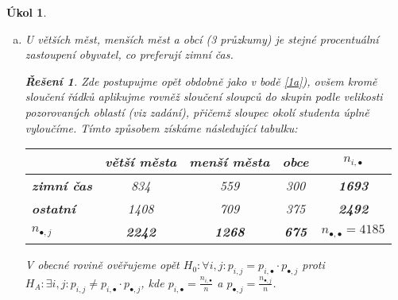 \documentclass[11pt, a4paper]{article}
\theoremstyle{result}
\newtheorem*{result}{Řešení}
\newtheorem{task}{Úkol}
\begin{document}
\begin{task}
\begin{enumerate}[a)]
        Všechny získané hodnoty splňují podmínku $\frac{n_{i, \bullet} \cdot n_{\bullet, j}}{n} > 5; \forall i,j$. Přejděme tedy k výpočtu testovacího kritéria:
        $$t = n \sum_{i=1}^{r} \sum_{j=1}^{c} \frac{n_{i, j}^2}{n_{i, \bullet} \cdot n_{\bullet, j}} - n = 17.1222$$

        Doplněk kritického oboru zůstává stejný jako v předcházejících bodech (viz bod \ref{1a})), tedy:
        $$\overline{W}_{0.05} = \langle 0, \chi_{0.95}^2(7) \rangle = \langle 0, 14.067 \rangle$$

        Vidíme, že $t \notin \overline{W}_{0.05}$, $H_0$ se proto \textbf{zamítá}. V městech, obcích a v okolí studenta tedy dle testu stejné procentuální zastoupení lidí, co preferují střídání časů, není.
        
        \item U větších měst, menších měst a obcí (3 průzkumy) je stejné procentuální zastoupení obyvatel, co preferují zimní čas. \label{1d}

        \begin{result}
            Zde postupujme opět obdobně jako v bodě \ref{1a}), ovšem kromě sloučení řádků aplikujme rovněž sloučení sloupců do skupin podle velikosti pozorovaných oblastí (viz zadání), přičemž sloupec \textit{okolí studenta} úplně vyloučíme. Tímto způsobem získáme následující tabulku:

            \begin{center}
                \begin{tabular}{ |l|c|c|c|c| }
                    \hline
                    & \textbf{větší města} & \textbf{menší města} & \textbf{obce} & \boldmath$n_{i, \bullet}$ \\
                    \hline
                    \textbf{zimní čas} & 834 & 559 & 300 & \textbf{1693} \\
                    \hline
                    \textbf{ostatní} & 1408 & 709 & 375 & \textbf{2492} \\
                    \hline
                    \boldmath$n_{\bullet, j}$ & \textbf{2242} & \textbf{1268} & \textbf{675} & \boldmath$n_{\bullet, \bullet} = 4185$ \\
                    \hline
                \end{tabular}
            \end{center}

            V obecné rovině ověřujeme opět $H_0: \forall i, j: p_{i, j} = p_{i, \bullet} \cdot p_{\bullet, j}$ proti $H_A: \exists i, j: p_{i, j} \neq p_{i, \bullet} \cdot p_{\bullet, j}$, kde $p_{i, \bullet} = \frac{n_{i, \bullet}}{n}$ a $p_{\bullet, j} = \frac{n_{\bullet, j}}{n}$.
    

\end{result}
\end{enumerate}
\end{task}
\end{document}

